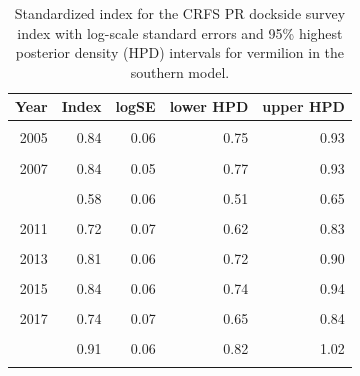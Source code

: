 \documentclass[11pt,
  english,
]{article}
\begin{document}
\begin{table}

\caption{\label{tab:tab-index-crfspr}Standardized index for the CRFS PR dockside survey index with log-scale standard errors and 95\% highest
       posterior density (HPD) intervals for vermilion in the southern model.}
\centering
\begin{tabular}[t]{rrrrr}
\toprule
Year & Index & logSE & lower HPD & upper HPD\\
\midrule
\cellcolor{gray!6}{2004} & \cellcolor{gray!6}{1.36} & \cellcolor{gray!6}{0.05} & \cellcolor{gray!6}{1.23} & \cellcolor{gray!6}{1.49}\\
2005 & 0.84 & 0.06 & 0.75 & 0.93\\
\cellcolor{gray!6}{2006} & \cellcolor{gray!6}{0.80} & \cellcolor{gray!6}{0.05} & \cellcolor{gray!6}{0.72} & \cellcolor{gray!6}{0.89}\\
2007 & 0.84 & 0.05 & 0.77 & 0.93\\
\cellcolor{gray!6}{2008} & \cellcolor{gray!6}{0.67} & \cellcolor{gray!6}{0.05} & \cellcolor{gray!6}{0.60} & \cellcolor{gray!6}{0.74}\\
\addlinespace
2009 & 0.58 & 0.06 & 0.51 & 0.65\\
\cellcolor{gray!6}{2010} & \cellcolor{gray!6}{0.61} & \cellcolor{gray!6}{0.07} & \cellcolor{gray!6}{0.53} & \cellcolor{gray!6}{0.70}\\
2011 & 0.72 & 0.07 & 0.62 & 0.83\\
\cellcolor{gray!6}{2012} & \cellcolor{gray!6}{0.69} & \cellcolor{gray!6}{0.07} & \cellcolor{gray!6}{0.60} & \cellcolor{gray!6}{0.80}\\
2013 & 0.81 & 0.06 & 0.72 & 0.90\\
\addlinespace
\cellcolor{gray!6}{2014} & \cellcolor{gray!6}{0.85} & \cellcolor{gray!6}{0.06} & \cellcolor{gray!6}{0.76} & \cellcolor{gray!6}{0.95}\\
2015 & 0.84 & 0.06 & 0.74 & 0.94\\
\cellcolor{gray!6}{2016} & \cellcolor{gray!6}{0.73} & \cellcolor{gray!6}{0.07} & \cellcolor{gray!6}{0.64} & \cellcolor{gray!6}{0.83}\\
2017 & 0.74 & 0.07 & 0.65 & 0.84\\
\cellcolor{gray!6}{2018} & \cellcolor{gray!6}{0.65} & \cellcolor{gray!6}{0.07} & \cellcolor{gray!6}{0.56} & \cellcolor{gray!6}{0.74}\\
\addlinespace
2019 & 0.91 & 0.06 & 0.82 & 1.02\\
\cellcolor{gray!6}{2020} & \cellcolor{gray!6}{0.77} & \cellcolor{gray!6}{0.17} & \cellcolor{gray!6}{0.55} & \cellcolor{gray!6}{1.05}\\
\bottomrule
\end{tabular}
\end{table}
\end{document}
